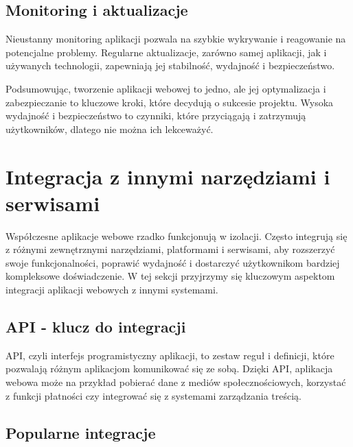 \subsection{Monitoring i aktualizacje}

Nieustanny monitoring aplikacji pozwala na szybkie wykrywanie i reagowanie na potencjalne problemy. Regularne aktualizacje, zarówno samej aplikacji, jak i używanych technologii, zapewniają jej stabilność, wydajność i bezpieczeństwo.

Podsumowując, tworzenie aplikacji webowej to jedno, ale jej optymalizacja i zabezpieczanie to kluczowe kroki, które decydują o sukcesie projektu. Wysoka wydajność i bezpieczeństwo to czynniki, które przyciągają i zatrzymują użytkowników, dlatego nie można ich lekceważyć.

\section{Integracja z innymi narzędziami i serwisami}

Współczesne aplikacje webowe rzadko funkcjonują w izolacji. Często integrują się z różnymi zewnętrznymi narzędziami, platformami i serwisami, aby rozszerzyć swoje funkcjonalności, poprawić wydajność i dostarczyć użytkownikom bardziej kompleksowe doświadczenie. W tej sekcji przyjrzymy się kluczowym aspektom integracji aplikacji webowych z innymi systemami.

\subsection{API - klucz do integracji \cite{apiIntegration}}

API, czyli interfejs programistyczny aplikacji, to zestaw reguł i definicji, które pozwalają różnym aplikacjom komunikować się ze sobą. Dzięki API, aplikacja webowa może na przykład pobierać dane z mediów społecznościowych, korzystać z funkcji płatności czy integrować się z systemami zarządzania treścią.

\subsection{Popularne integracje}

